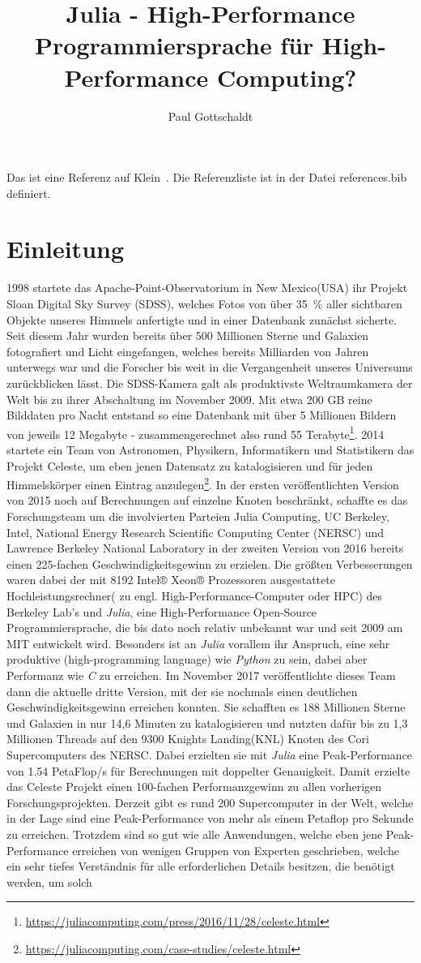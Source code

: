 \documentclass[proseminar,german,utf8]{zihpub}
\author{Paul Gottschaldt}
\title{Julia - High-Performance Programmiersprache für High-Performance Computing?}
\begin{document}
Das ist eine Referenz auf Klein~\cite{blackholes}. Die Referenzliste ist in der Datei references.bib definiert.
\section {Einleitung}
1998 startete das Apache-Point-Observatorium in New Mexico(USA) ihr Projekt Sloan Digital Sky Survey (SDSS), welches Fotos von über 35~\% aller sichtbaren Objekte unseres Himmels anfertigte und in einer Datenbank zunächst sicherte. Seit diesem Jahr wurden bereits über 500 Millionen Sterne und Galaxien fotografiert und Licht eingefangen, welches bereits Milliarden von Jahren unterwegs war und die Forscher bis weit in die Vergangenheit unseres Universums zurückblicken lässt. Die SDSS-Kamera galt als produktivste Weltraumkamera der Welt bis zu ihrer Abschaltung im November 2009. Mit etwa 200 GB reine Bilddaten pro Nacht entstand so eine Datenbank mit über 5 Millionen Bildern von jeweils 12 Megabyte - zusammengerechnet also rund 55 Terabyte\footnote{\url{https://juliacomputing.com/press/2016/11/28/celeste.html}}. 2014 startete ein Team von Astronomen, Physikern, Informatikern und Statistikern das Projekt Celeste, um eben jenen Datensatz zu katalogisieren und für jeden Himmelskörper einen Eintrag anzulegen\footnote{\url{https://juliacomputing.com/case-studies/celeste.html}}. In der ersten veröffentlichten Version von 2015 noch auf Berechnungen auf einzelne Knoten beschränkt, schaffte es das Forschungsteam um die involvierten Parteien Julia Computing, UC Berkeley, Intel, National Energy Research Scientific Computing Center (NERSC) und Lawrence Berkeley National Laboratory in der zweiten Version von 2016 bereits einen 225-fachen Geschwindigkeitsgewinn zu erzielen. Die größten Verbesserungen waren dabei der mit 8192 Intel® Xeon® Prozessoren ausgestattete Hochleistungsrechner( zu engl. High-Performance-Computer oder HPC) des Berkeley Lab's und \textit{Julia}, eine High-Performance Open-Source Programmiersprache, die bis dato noch relativ unbekannt war und seit 2009 am MIT entwickelt wird. Besonders ist an \textit{Julia} vorallem ihr Anspruch, eine sehr produktive (high-programming language) wie \textit{Python} zu sein, dabei aber Performanz wie \textit{C} zu erreichen. Im November 2017 veröffentlichte dieses Team dann die aktuelle dritte Version, mit der sie nochmals einen deutlichen Geschwindigkeitsgewinn erreichen konnten. Sie schafften es 188 Millionen Sterne und Galaxien in nur 14,6 Minuten zu katalogisieren und nutzten dafür bis zu 1,3 Millionen Threads auf den 9300 Knights Landing(KNL) Knoten des Cori Supercomputers des NERSC. Dabei erzielten sie mit \textit{Julia} eine Peak-Performance von 1.54 PetaFlop/s für Berechnungen mit doppelter Genauigkeit. Damit erzielte das Celeste Projekt einen 100-fachen Performanzgewinn zu allen vorherigen Forschungsprojekten. Derzeit gibt es rund 200 Supercomputer in der Welt, welche in der Lage sind eine Peak-Performance von mehr als einem Petaflop pro Sekunde zu erreichen. Trotzdem sind so gut wie alle Anwendungen, welche eben jene Peak-Performance erreichen von wenigen Gruppen von Experten geschrieben, welche ein sehr tiefes Verständnis für alle erforderlichen Details besitzen, die benötigt werden, um solch 
\end{document}
